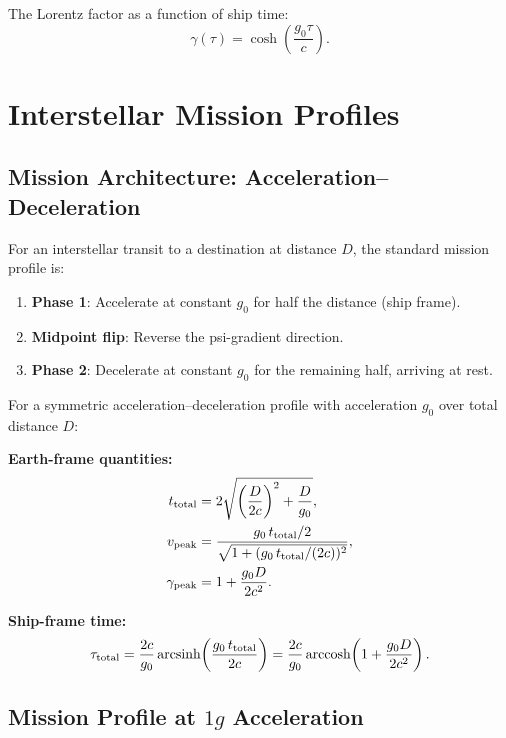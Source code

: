 \documentclass[aps,prd,twocolumn,superscriptaddress,nofootinbib]{revtex4-2}
\begin{document}
The Lorentz factor as a function of ship time:
\begin{equation}
\gamma(\tau) = \cosh\!\left(\frac{g_0\tau}{c}\right).
\end{equation}

\section{Interstellar Mission Profiles}\label{sec:missions}

\subsection{Mission Architecture: Acceleration--Deceleration}

For an interstellar transit to a destination at distance $D$, the
standard mission profile is:
\begin{enumerate}
\item \textbf{Phase 1}: Accelerate at constant $g_0$ for half the
distance (ship frame).
\item \textbf{Midpoint flip}: Reverse the psi-gradient direction.
\item \textbf{Phase 2}: Decelerate at constant $g_0$ for the remaining
half, arriving at rest.
\end{enumerate}

For a symmetric acceleration--deceleration profile with acceleration
$g_0$ over total distance $D$:

\textbf{Earth-frame quantities:}
\begin{align}
t_{\rm total} &= 2\sqrt{\left(\frac{D}{2c}\right)^2
+ \frac{D}{g_0}}, \label{eq:t-earth}\\
v_{\rm peak} &= \frac{g_0\,t_{\rm total}/2}
{\sqrt{1 + (g_0\,t_{\rm total}/(2c))^2}}, \label{eq:v-peak}\\
\gamma_{\rm peak} &= 1 + \frac{g_0 D}{2c^2}. \label{eq:gamma-peak}
\end{align}

\textbf{Ship-frame time:}
\begin{equation}\label{eq:tau-total}
\tau_{\rm total} = \frac{2c}{g_0}\,\text{arcsinh}\!\left(
\frac{g_0\,t_{\rm total}}{2c}\right)
= \frac{2c}{g_0}\,\text{arccosh}\!\left(1 + \frac{g_0 D}{2c^2}\right).
\end{equation}

\subsection{Mission Profile at $1g$ Acceleration}
\end{document}
